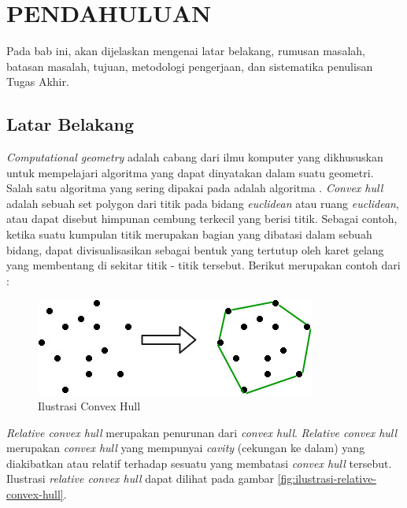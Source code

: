 \vspace{0ex}
\chapter {PENDAHULUAN}

Pada bab ini, akan dijelaskan mengenai latar belakang, rumusan masalah, batasan masalah, tujuan, metodologi pengerjaan, dan sistematika penulisan Tugas Akhir.

\section{Latar Belakang}

\par \textit{Computational geometry} adalah cabang dari ilmu komputer yang dikhususkan untuk mempelajari algoritma yang dapat dinyatakan dalam suatu geometri. Salah satu algoritma yang sering dipakai pada \CG adalah algoritma \CH. \textit{Convex hull} adalah sebuah set polygon dari titik pada bidang \textit{euclidean} atau ruang \textit{euclidean}, atau dapat disebut himpunan cembung terkecil yang berisi titik. Sebagai contoh, ketika suatu kumpulan titik merupakan bagian yang dibatasi dalam sebuah bidang, \CH dapat divisualisasikan sebagai bentuk yang tertutup oleh karet gelang yang membentang di sekitar titik - titik tersebut. Berikut merupakan contoh dari \CH :
\begin{figure}[!h]
	\Centering
	\includegraphics [width=\textwidth]{bab1/img/ilustrasi-convex-hull}
	\caption {Ilustrasi Convex Hull}
	\label {fig:ilustrasi-convex-hull}
\end{figure}
\par \textit{Relative convex hull} merupakan penurunan dari \textit{convex hull}. \textit{Relative convex hull} merupakan \textit{convex hull} yang mempunyai \textit{cavity} (cekungan ke dalam) yang diakibatkan atau relatif terhadap sesuatu yang membatasi \textit{convex hull} tersebut. Ilustrasi \textit{relative convex hull} dapat dilihat pada gambar \ref{fig:ilustrasi-relative-convex-hull}.

